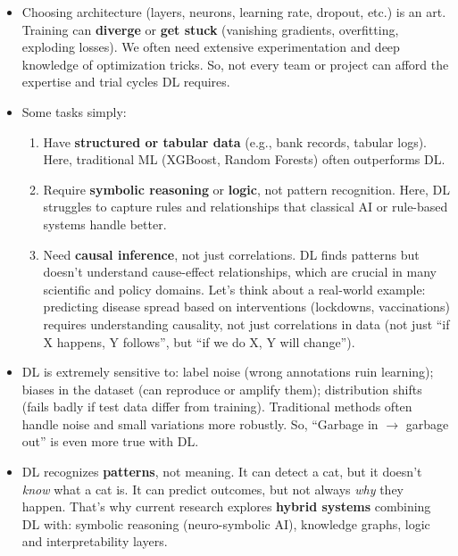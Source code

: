 \begin{deepeningbox}
\begin{itemize}
        \item {} Choosing architecture (layers, neurons, learning rate, dropout, etc.) is an art. Training can \textbf{diverge} or \textbf{get stuck} (vanishing gradients, overfitting, exploding losses). We often need extensive experimentation and deep knowledge of optimization tricks. So, not every team or project can afford the expertise and trial cycles DL requires.

        \item {} Some tasks simply:
        \begin{enumerate}
            \item Have \textbf{structured or tabular data} (e.g., bank records, tabular logs). Here, traditional ML (XGBoost, Random Forests) often outperforms DL.
            \item Require \textbf{symbolic reasoning} or \textbf{logic}, not pattern recognition. Here, DL struggles to capture rules and relationships that classical AI or rule-based systems handle better.
            \item Need \textbf{causal inference}, not just correlations. DL finds patterns but doesn't understand cause-effect relationships, which are crucial in many scientific and policy domains. Let's think about a real-world example: predicting disease spread based on interventions (lockdowns, vaccinations) requires understanding causality, not just correlations in data (not just ``if X happens, Y follows'', but ``if we do X, Y will change'').
        \end{enumerate}

        \item {} DL is extremely sensitive to: label noise (wrong annotations ruin learning); biases in the dataset (can reproduce or amplify them); distribution shifts (fails badly if test data differ from training). Traditional methods often handle noise and small variations more robustly. So, ``Garbage in $\to$ garbage out'' is even more true with DL.
        
        \item {} DL recognizes \textbf{patterns}, not meaning. It can detect a cat, but it doesn't \emph{know} what a cat is. It can predict outcomes, but not always \emph{why} they happen. That's why current research explores \textbf{hybrid systems} combining DL with: symbolic reasoning (neuro-symbolic AI), knowledge graphs, logic and interpretability layers.
    \end{itemize}
\end{deepeningbox}

